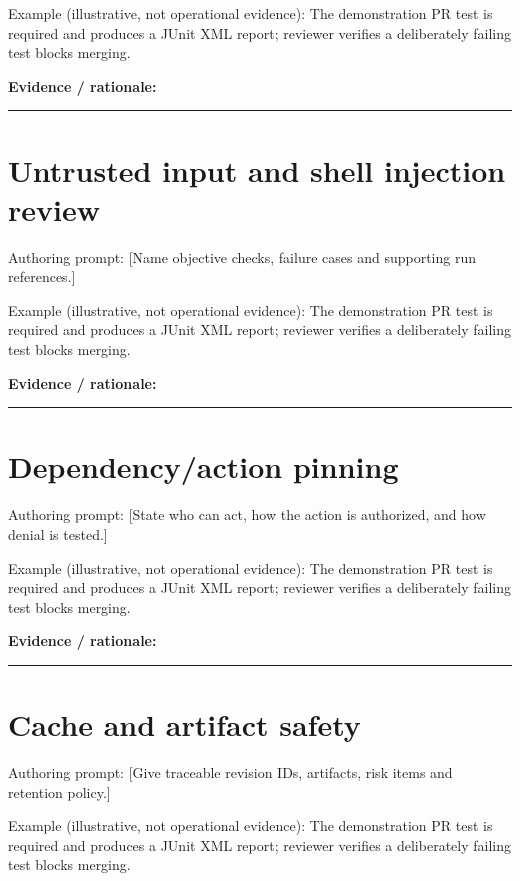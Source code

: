 \documentclass[11pt,letterpaper]{article}
\begin{document}
Example (illustrative, not operational evidence): The demonstration PR test is required and produces a JUnit XML report; reviewer verifies a deliberately failing test blocks merging.

\noindent\textbf{Evidence / rationale:}\par\nobreak\vspace{8pt}\noindent\rule{0.93\linewidth}{0.4pt}\par\vspace{14pt}
\section{Untrusted input and shell injection review}
Authoring prompt: [Name objective checks, failure cases and supporting run references.]

Example (illustrative, not operational evidence): The demonstration PR test is required and produces a JUnit XML report; reviewer verifies a deliberately failing test blocks merging.

\noindent\textbf{Evidence / rationale:}\par\nobreak\vspace{8pt}\noindent\rule{0.93\linewidth}{0.4pt}\par\vspace{14pt}
\section{Dependency/action pinning}
Authoring prompt: [State who can act, how the action is authorized, and how denial is tested.]

Example (illustrative, not operational evidence): The demonstration PR test is required and produces a JUnit XML report; reviewer verifies a deliberately failing test blocks merging.

\noindent\textbf{Evidence / rationale:}\par\nobreak\vspace{8pt}\noindent\rule{0.93\linewidth}{0.4pt}\par\vspace{14pt}
\section{Cache and artifact safety}
Authoring prompt: [Give traceable revision IDs, artifacts, risk items and retention policy.]

Example (illustrative, not operational evidence): The demonstration PR test is required and produces a JUnit XML report; reviewer verifies a deliberately failing test blocks merging.
\end{document}

